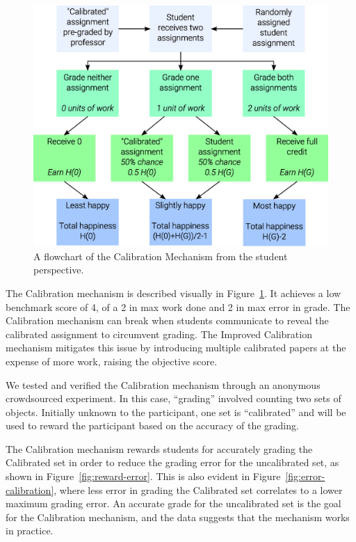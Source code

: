 \documentclass{sigchi}
\begin{document}
\begin{figure}[!h]
\centering
\includegraphics[width=0.9\columnwidth]{Calibration-Flowchart.eps}
\caption{A flowchart of the Calibration Mechanism from the student perspective.}
\label{fig:calibration}
\end{figure}

The Calibration mechanism is described visually in Figure~\ref{fig:calibration}. It achieves a low benchmark score of 4, of a 2 in max work done and 2 in max error in grade.
The Calibration mechanism can break when students communicate to reveal the calibrated assignment to circumvent grading. The Improved Calibration mechanism mitigates this issue by introducing multiple calibrated papers at the expense of more work, raising the objective score.

We tested and verified the Calibration mechanism through an anonymous crowdsourced experiment. In this case, ``grading'' involved counting two sets of objects. Initially unknown to the participant, one set is ``calibrated'' and will be used to reward the participant based on the accuracy of the grading.

The Calibration mechanism rewards students for accurately grading the Calibrated set in order to reduce the grading error for the uncalibrated set, as shown in Figure~\ref{fig:reward-error}. This is also evident in Figure~\ref{fig:error-calibration}, where less error in grading the Calibrated set correlates to a lower maximum grading error. An accurate grade for the uncalibrated set is the goal for the Calibration mechanism, and the data suggests that the mechanism works in practice.
\end{document}
